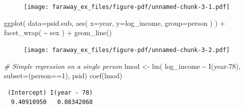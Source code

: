 \documentclass[
  letterpaper,
  DIV=11,
  numbers=noendperiod]{scrreprt}
\newenvironment{Shaded}{\begin{snugshade}}{\end{snugshade}}
\newcommand{\AttributeTok}[1]{\textcolor[rgb]{0.49,0.56,0.16}{#1}}
\newcommand{\CommentTok}[1]{\textcolor[rgb]{0.38,0.63,0.69}{\textit{#1}}}
\newcommand{\ControlFlowTok}[1]{\textcolor[rgb]{0.00,0.44,0.13}{\textbf{#1}}}
\newcommand{\DecValTok}[1]{\textcolor[rgb]{0.25,0.63,0.44}{#1}}
\newcommand{\FunctionTok}[1]{\textcolor[rgb]{0.02,0.16,0.49}{#1}}
\newcommand{\NormalTok}[1]{\textcolor[rgb]{0.00,0.44,0.13}{#1}}
\newcommand{\OtherTok}[1]{\textcolor[rgb]{0.00,0.44,0.13}{#1}}
\newcommand{\SpecialCharTok}[1]{\textcolor[rgb]{0.25,0.44,0.63}{#1}}
\newcommand{\StringTok}[1]{\textcolor[rgb]{0.25,0.44,0.63}{#1}}
\begin{document}
\begin{figure}[H]

{\centering \texttt{[image: faraway\_ex\_files/figure-pdf/unnamed-chunk-3-1.pdf]}

}

\end{figure}

\begin{Shaded}
\begin{Highlighting}[]
\FunctionTok{ggplot}\NormalTok{( }\AttributeTok{data=}\NormalTok{psid.sub, }\FunctionTok{aes}\NormalTok{( }\AttributeTok{x=}\NormalTok{year, }\AttributeTok{y=}\NormalTok{log\_income, }\AttributeTok{group=}\NormalTok{person ) ) }\SpecialCharTok{+}
    \FunctionTok{facet\_wrap}\NormalTok{( }\SpecialCharTok{\textasciitilde{}}\NormalTok{ sex ) }\SpecialCharTok{+}
    \FunctionTok{geom\_line}\NormalTok{()}
\end{Highlighting}
\end{Shaded}

\begin{figure}[H]

{\centering \texttt{[image: faraway\_ex\_files/figure-pdf/unnamed-chunk-3-2.pdf]}

}

\end{figure}

\begin{Shaded}
\begin{Highlighting}[]
\CommentTok{\# Simple regression on a single person}
\NormalTok{lmod }\OtherTok{\textless{}{-}} \FunctionTok{lm}\NormalTok{( log\_income }\SpecialCharTok{\textasciitilde{}} \FunctionTok{I}\NormalTok{(year}\DecValTok{{-}78}\NormalTok{), }\AttributeTok{subset=}\NormalTok{(person}\SpecialCharTok{==}\DecValTok{1}\NormalTok{), psid)}
\FunctionTok{coef}\NormalTok{(lmod)}
\end{Highlighting}
\end{Shaded}

\begin{verbatim}
 (Intercept) I(year - 78) 
  9.40910950   0.08342068 
\end{verbatim}

\begin{Shaded}
\end{Shaded}
\end{document}
